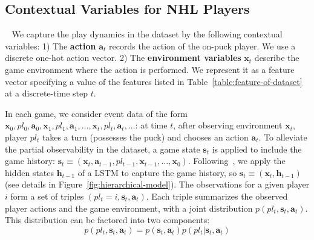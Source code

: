 \documentclass{article}
\newcommand{\generation}{p}
\newcommand{\hiddenstate}{\mathbf{h}}
\newcommand{\state}{\mathbf{s}}
\newcommand{\action}{\mathbf{a}}
\newcommand{\reward}{r}
\newcommand{\player}{pl}
\newcommand{\pindex}{i}
\newcommand{\features}{\boldsymbol{x}}
\begin{document}
\subsection{Contextual Variables for NHL Players}~\label{sec:context-nhl}
We capture the play dynamics in the dataset by the following contextual variables:
1) The \textbf{action} $\action_t$ records the action of the on-puck player.
We use a discrete one-hot action vector. 
2) The \textbf{environment variables} $\features_{t}$ describe the game environment where the action is performed. We represent it as a feature vector specifying a value of the features listed in Table~\ref{table:feature-of-dataset} at a discrete-time step $t$. 

In each game, we consider event data of the form
$\features_0,\player_0,\action_0,\features_1,\player_1,\action_1,\ldots,\features_{t},\player_{t},\action_{t},\ldots$:
at time $t$, after observing environment $\features_{t}$, player $\player_{t}$ takes a turn (possesses the puck) and chooses an action $\action_{t}$.
To alleviate the partial observability in the dataset, a game state $\state_{t}$ is applied to include the game history: $\state_{t} \equiv (\features_t, \action_{t-1},\player_{t-1},\features_{t-1},\ldots,\features_{0})$. Following~\cite{littlestone}, we apply the hidden states $\hiddenstate_{t-1}$ of a LSTM to capture the game history, so $\state_t \equiv (\features_{t},\hiddenstate_{t-1})$ (see details in Figure~\ref{fig:hierarchical-model}).
The observations for a given player $\pindex$ 
form a set of triples $(\player_{t} = \pindex, \state_{t}, \action_{t})$.
Each triple summarizes the observed player actions and the game environment, with a joint distribution $\generation(\player_{t}, \state_{t}, \action_{t})$. This distribution can be factored into two components:
\begin{equation}
    \label{eq:player-factor} 
    \generation(\player_{t}, \state_{t}, \action_{t}) = \generation(\state_{t},\action_{t})\generation(\player_{t}|\state_{t},\action_{t})
\end{equation}
\end{document}
